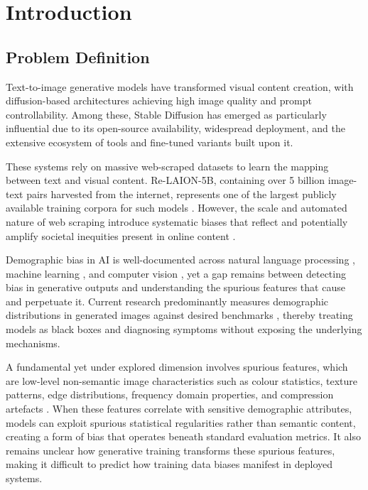 \chapter{Introduction}%
\label{chp:introduction}

\section{Problem Definition}
Text-to-image generative models have transformed visual content creation, with diffusion-based
architectures achieving high image quality and prompt controllability. Among these, Stable Diffusion \cite{Rombach_2022_CVPR} has emerged as particularly influential due to its open-source availability, widespread deployment, and the extensive ecosystem of tools and fine-tuned variants built upon it.

These systems rely on massive web-scraped datasets to learn the mapping between text and
visual content. Re-LAION-5B, containing over 5 billion image-text pairs harvested from the
internet, represents one of the largest publicly available training corpora for such models
\cite{Schuhmann_2022_Laion5b}. However, the scale and automated nature of web scraping
introduce systematic biases that reflect and potentially amplify societal inequities present
in online content \cite{Birhane_2021_MultiModalDatasetsMisogynyPornography}.

Demographic bias in AI is well-documented across natural language processing
\cite{Bolukbasi_2016_ManComputerProgrammerWoman}, machine learning
\cite{Mehrabi_2022_SurveyBiasFairnessMachine}, and computer vision
\cite{Buolamwini_2018_GenderShades}, yet a gap remains between detecting bias
in generative outputs and understanding the spurious features that cause and
perpetuate it. Current research predominantly measures demographic distributions in generated images against desired benchmarks \cite{Luccioni_2023_AnalyzingSocietalRepresentationsDiffusionModels, Bianchi_2023_TTIGenAmplifiesDemographicStereotypes}, thereby treating models as black boxes and diagnosing symptoms without exposing the underlying mechanisms.

A fundamental yet under explored dimension involves spurious features, which are low-level
non-semantic image characteristics such as colour statistics, texture patterns, edge
distributions, frequency domain properties, and compression artefacts
\cite{Meister_2023_GenderArtifactsinVisualDatasets, Zeng_2024_UnderstandingBiasinLargeScaleVisualDatasets}. When these features correlate with sensitive demographic attributes, models can exploit spurious  statistical regularities rather than semantic content, creating a form of bias that operates beneath standard
evaluation metrics. It also remains unclear how generative training transforms these spurious
features, making it difficult to predict how training data biases manifest in deployed systems.

